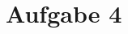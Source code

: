 \chapter{Aufgabe 4}
\label{sec:aufgabe4}


\begin{figure}[h]
\begin{code}[language=java, caption={}, label={}]
\end{code}
\end{figure}